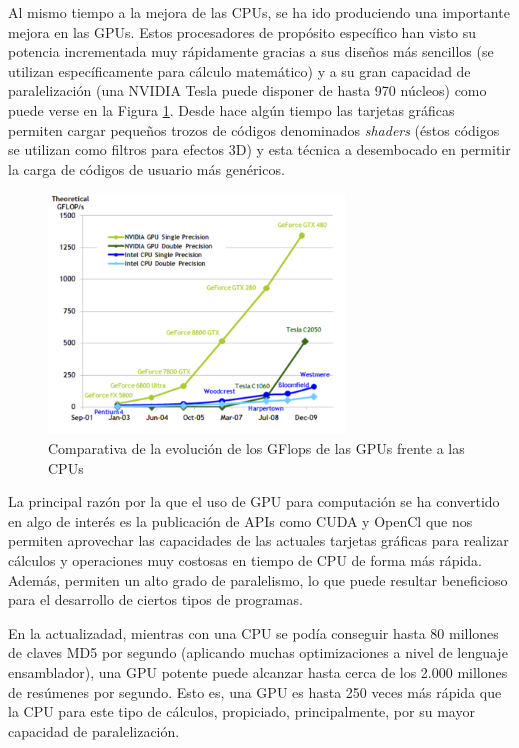 Al mismo tiempo a la mejora de las CPUs, se ha ido produciendo una importante mejora en las GPUs. Estos procesadores de propósito específico han visto su potencia incrementada muy rápidamente gracias a sus diseños más sencillos (se utilizan específicamente para cálculo matemático) y a su gran capacidad de paralelización (una NVIDIA Tesla puede disponer de hasta 970 núcleos) como puede verse en la Figura \ref{fig:GPUvsCPU}. Desde hace algún tiempo las tarjetas gráficas permiten cargar pequeños trozos de códigos denominados \emph{shaders} (éstos códigos se utilizan como filtros para efectos 3D) y esta técnica a desembocado en permitir la carga de códigos de usuario más genéricos.

\begin{figure}
	\centering
	\includegraphics[width=0.7\textwidth]{images/evolucion-gpu.png}
	\caption{Comparativa de la evolución de los GFlops de las GPUs frente a las CPUs\cite{nvidia:cuda_c_programming_guide}}\label{fig:GPUvsCPU}
\end{figure}

La principal razón por la que el uso de GPU para computación se ha convertido en algo de interés es la publicación de APIs como CUDA y OpenCl que nos permiten aprovechar las capacidades de las actuales tarjetas gráficas para realizar cálculos y operaciones muy costosas en tiempo de CPU de forma más rápida. Además, permiten un alto grado de paralelismo, lo que puede resultar beneficioso para el desarrollo de ciertos tipos de programas.

En la actualizadad, mientras con una CPU se podía conseguir hasta 80 millones de claves MD5 por segundo (aplicando muchas optimizaciones a nivel de lenguaje ensamblador), una GPU potente puede alcanzar hasta cerca de los 2.000 millones de resúmenes por segundo. Esto es, una GPU es hasta 250 veces más rápida que la CPU para este tipo de cálculos, propiciado, principalmente, por su mayor capacidad de paralelización.

